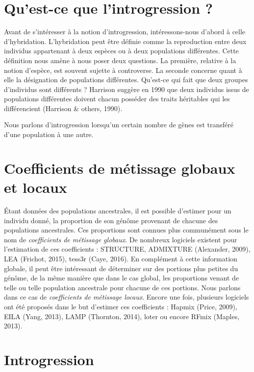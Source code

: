 \documentclass[12pt,twoside]{reedthesis}
\theoremstyle{definition}
\theoremstyle{definition}
\theoremstyle{remark}
\begin{document}
  \section{Qu'est-ce que l'introgression
  ?}\label{quest-ce-que-lintrogression}
  
  Avant de s'intéresser à la notion d'introgression, intéressons-nous
  d'abord à celle d'hybridation. L'hybridation peut être définie comme la
  reproduction entre deux individus appartenant à deux espèces ou à deux
  populations différentes. Cette définition nous amène à nous poser deux
  questions. La première, relative à la notion d'espèce, est souvent
  sujette à controverse. La seconde concerne quant à elle la désignation
  de populations différentes. Qu'est-ce qui fait que deux groupes
  d'individus sont différents ? Harrison suggère en 1990 que deux
  individus issus de populations différentes doivent chacun posséder des
  traits héritables qui les différencient (Harrison \& others, 1990).
  
  Nous parlons d'introgression lorsqu'un certain nombre de gènes est
  transféré d'une population à une autre.
  
  \section{Coefficients de métissage globaux et
  locaux}\label{coefficients-de-metissage-globaux-et-locaux}
  
  Étant données des populations ancestrales, il est possible d'estimer
  pour un individu donné, la proportion de son génôme provenant de chacune
  des populations ancestrales. Ces proportions sont connues plus
  communément sous le nom de \emph{coefficients de métissage globaux}. De
  nombreux logiciels existent pour l'estimation de ces coefficients :
  STRUCTURE, ADMIXTURE (Alexander, 2009), LEA (Frichot, 2015), tess3r
  (Caye, 2016). En complément à cette information globale, il peut être
  intéressant de déterminer sur des portions plus petites du génôme, de la
  même manière que dans le cas global, les proportions venant de telle ou
  telle population ancestrale pour chacune de ces portions. Nous parlons
  dans ce cas de \emph{coefficients de métissage locaux}. Encore une fois,
  plusieurs logiciels ont été proposés dans le but d'estimer ces
  coefficients : Hapmix (Price, 2009), EILA (Yang, 2013), LAMP (Thornton,
  2014), loter ou encore RFmix (Maples, 2013).
  
  \section{Introgression}\label{introgression}
  
\end{document}
